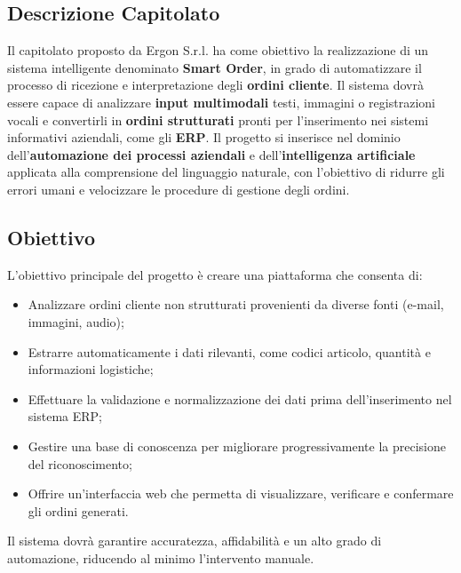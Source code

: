 \documentclass[a4paper,12pt]{article}
\begin{document}
{{{    \subsection{Descrizione Capitolato}
        Il capitolato proposto da Ergon S.r.l. ha come obiettivo la realizzazione di un sistema intelligente denominato \textbf{Smart Order}, in grado di automatizzare il processo di ricezione e interpretazione degli \textbf{ordini cliente}.
        Il sistema dovrà essere capace di analizzare \textbf{input multimodali} testi, immagini o registrazioni vocali e convertirli in \textbf{ordini strutturati} pronti per l’inserimento nei sistemi informativi aziendali, come gli \textbf{ERP}.
        Il progetto si inserisce nel dominio dell’\textbf{automazione dei processi aziendali} e dell’\textbf{intelligenza artificiale} applicata alla comprensione del linguaggio naturale, con l’obiettivo di ridurre gli errori umani e velocizzare le procedure di gestione degli ordini.
    

    \subsection{Obiettivo}
        L’obiettivo principale del progetto è creare una piattaforma che consenta di:
        \begin{itemize}
            \item Analizzare ordini cliente non strutturati provenienti da diverse fonti (e-mail, immagini, audio);
            \item Estrarre automaticamente i dati rilevanti, come codici articolo, quantità e informazioni logistiche;
            \item Effettuare la validazione e normalizzazione dei dati prima dell’inserimento nel sistema ERP;
            \item Gestire una base di conoscenza per migliorare progressivamente la precisione del riconoscimento;
            \item Offrire un’interfaccia web che permetta di visualizzare, verificare e confermare gli ordini generati.
        \end{itemize}
        Il sistema dovrà garantire accuratezza, affidabilità e un alto grado di automazione, riducendo al minimo l’intervento manuale.
    

}}}
\end{document}
